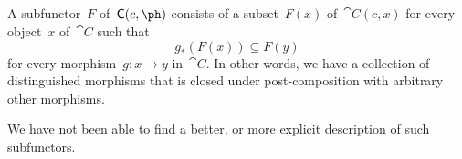 \subsection{}

A subfunctor~$F$ of~$\cat{C}(c, \ph)$ consists of a subset~$F(x)$ of~$\cat{C}(c, x)$ for every object~$x$ of~$\cat{C}$ such that
\[
	g_*( F(x) ) ⊆ F(y)
\]
for every morphism~$g \colon x \to y$ in~$\cat{C}$.
In other words, we have a collection of distinguished morphisms that is closed under post-composition with arbitrary other morphisms.

We have not been able to find a better, or more explicit description of such subfunctors.
